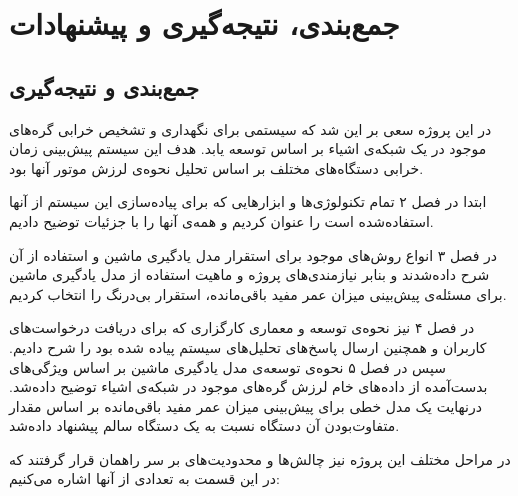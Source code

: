 \chapter{جمع‌بندی، نتیجه‌گیری و پیشنهادات}


\section{جمع‌بندی و نتیجه‌گیری}
در این پروژه سعی بر این شد که سیستمی برای نگهداری و تشخیص خرابی گره‌های موجود در یک شبکه‌ی اشیاء بر اساس \cite{jung2017vibration} توسعه یابد. هدف این سیستم پیش‌بینی زمان خرابی دستگاه‌های مختلف بر اساس تحلیل نحوه‌ی لرزش موتور آنها بود.

ابتدا در فصل ۲ تمام تکنولوژی‌ها و ابزارهایی که برای پیاده‌سازی این سیستم از آنها استفاده‌شده است را عنوان کردیم و همه‌ی آنها را با جزئیات توضیح دادیم.

در فصل ۳ انواع روش‌های موجود برای استقرار مدل یادگیری ماشین و استفاده از آن شرح داده‌شدند و بنابر نیازمندی‌های پروژه و ماهیت استفاده از مدل یادگیری ماشین برای مسئله‌ی پیش‌بینی میزان عمر مفید باقی‌مانده، استقرار بی‌درنگ را انتخاب کردیم.

در فصل ۴ نیز نحوه‌ی توسعه و معماری کارگزاری که برای دریافت درخواست‌های کاربران و همچنین ارسال پاسخ‌های تحلیل‌های سیستم پیاده شده‌ بود را شرح دادیم. سپس در فصل ۵ نحوه‌ی توسعه‌ی مدل یادگیری ماشین بر اساس ویژگی‌های بدست‌آمده از داده‌های خام لرزش گره‌های موجود در شبکه‌ی اشیاء توضیح داده‌شد. درنهایت یک مدل خطی برای پیش‌بینی میزان عمر مفید باقی‌مانده بر اساس مقدار متفاوت‌بودن آن دستگاه نسبت به یک دستگاه سالم پیشنهاد داده‌شد.


در مراحل مختلف این پروژه نیز چالش‌ها و محدودیت‌های بر سر راهمان قرار گرفتند که در این قسمت به تعدادی از آنها اشاره می‌کنیم: 

